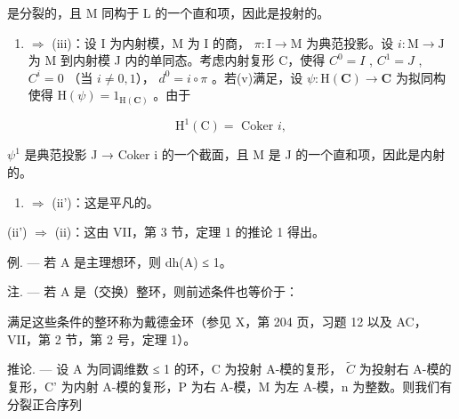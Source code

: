 是分裂的，且 M 同构于 L 的一个直和项，因此是投射的。

\begin{enumerate}
\def\labelenumi{(\alph{enumi})}
\setcounter{enumi}{21}
\tightlist
\item
  \(\Rightarrow\) (iii)：设 I 为内射模，M 为 I 的商， \(\pi : \mathrm{I} \to \mathrm{M}\) 为典范投影。设 \(i: \mathrm{M} \to \mathrm{J}\) 为 M 到内射模 J 内的单同态。考虑内射复形 C，使得 \(C^0 = I\) , \(C^1 = J\) , \(C^i = 0\) （当 \(i \neq 0, 1\)）， \(d^0 = i \circ \pi\) 。若(v)满足，设 \(\psi : \mathrm{H}(\mathbf{C}) \to \mathbf{C}\) 为拟同构使得 \(\mathrm{H}(\psi) = 1_{\mathrm{H}(\mathbf{C})}\) 。由于
\end{enumerate}

\[
\mathrm{H} ^ {1} (\mathrm{C}) = \text { Coker } i  ,
\]

\(\psi^{1}\) 是典范投影 J → Coker i 的一个截面，且 M 是 J 的一个直和项，因此是内射的。

\begin{enumerate}
\def\labelenumi{(\roman{enumi})}
\setcounter{enumi}{1}
\tightlist
\item
  \(\Rightarrow\) (ii')：这是平凡的。
\end{enumerate}

(ii') \(\Rightarrow\) (ii)：这由 VII，第 3 节，定理 1 的推论 1 得出。

例. --- 若 A 是主理想环，则 dh(A) ≤ 1。

注. --- 若 A 是（交换）整环，则前述条件也等价于：

满足这些条件的整环称为戴德金环（参见 X，第 204 页，习题 12 以及 AC，VII，第 2 节，第 2 号，定理 1）。

推论. --- 设 A 为同调维数 ≤ 1 的环，C 为投射 A-模的复形， \(\tilde{C}\) 为投射右 A-模的复形，C' 为内射 A-模的复形，P 为右 A-模，M 为左 A-模，n 为整数。则我们有分裂正合序列

